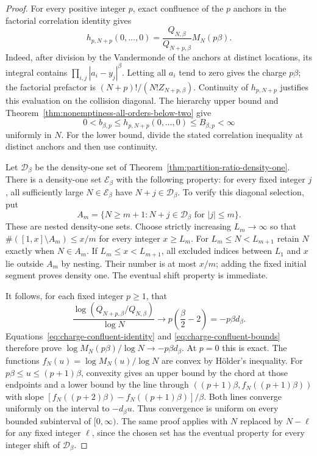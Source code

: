 \documentclass[11pt,a4paper]{article}
\numberwithin{equation}{section}
\theoremstyle{definition}
\theoremstyle{remark}
\begin{document}
\begin{proof}
For every positive integer $p$, exact confluence of the $p$ anchors
in the factorial correlation identity gives
\begin{equation}
 h_{p,N+p}(0,\ldots,0)
    =\frac{Q_{N,\beta}}{Q_{N+p,\beta}}M_N(p\beta).
 \label{eq:charge-confluent-identity}
\end{equation}
Indeed, after division by the Vandermonde of the anchors at distinct
locations, its integral contains $\prod_{i,j}|a_i-y_j|^\beta$.
Letting all $a_i$ tend to zero gives the charge $p\beta$; the
factorial prefactor is $(N+p)!/(N!Z_{N+p,\beta})$.
Continuity of $h_{p,N+p}$ justifies this evaluation on the collision
diagonal.  The hierarchy upper bound and
Theorem~\ref{thm:nonemptiness-all-orders-below-two} give
\begin{equation}
 0<b_{\beta,p}\le h_{p,N+p}(0,\ldots,0)
                    \le B_{\beta,p}<\infty
 \label{eq:charge-confluent-bounds}
\end{equation}
uniformly in $N$.  For the lower bound, divide the stated correlation
inequality at distinct anchors and then use continuity.

Let $\mathcal D_\beta$ be the density-one set of
Theorem~\ref{thm:partition-ratio-density-one}.  There is a density-one
set $\mathcal E_\beta$ with the following property: for every fixed
integer $j$, all sufficiently large $N\in\mathcal E_\beta$ have
$N+j\in\mathcal D_\beta$.  To verify this diagonal selection, put
\[
 A_m=\{N\ge m+1:N+j\in\mathcal D_\beta\text{ for }|j|\le m\}.
\]
These are nested density-one sets.  Choose strictly increasing
$L_m\to\infty$ so that
$\#([1,x]\setminus A_m)\le x/m$ for every integer $x\ge L_m$.
For $L_m\le N<L_{m+1}$ retain $N$ exactly when $N\in A_m$.
If $L_m\le x<L_{m+1}$, all excluded indices between $L_1$ and $x$
lie outside $A_m$ by nesting.  Their number is at most $x/m$;
adding the fixed initial segment proves density one.  The eventual
shift property is immediate.

It follows, for each fixed integer $p\ge1$, that
\[
 \frac{\log(Q_{N+p,\beta}/Q_{N,\beta})}{\log N}
 \longrightarrow p\left(\frac\beta2-2\right)=-p\beta d_\beta.
\]
Equations~\eqref{eq:charge-confluent-identity} and
\eqref{eq:charge-confluent-bounds} therefore prove
$\log M_N(p\beta)/\log N\to-p\beta d_\beta$.
At $p=0$ this is exact.  The functions
$f_N(u)=\log M_N(u)/\log N$ are convex by H\"older's inequality.
For $p\beta\le u\le(p+1)\beta$, convexity gives an upper bound by
the chord at those endpoints and a lower bound by the line through
$((p+1)\beta,f_N((p+1)\beta))$ with slope
$[f_N((p+2)\beta)-f_N((p+1)\beta)]/\beta$.
Both lines converge uniformly on the interval to $-d_\beta u$.
Thus convergence is uniform on every bounded subinterval of
$[0,\infty)$.  The same proof applies with $N$ replaced by $N-\ell$
for any fixed integer $\ell$, since the chosen set has the eventual
property for every integer shift of $\mathcal D_\beta$.


\end{proof}
\end{document}

